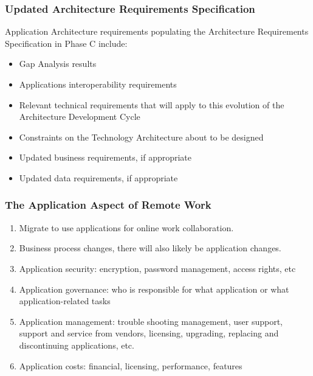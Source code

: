 \documentclass[aspectratio=169, table]{beamer}
\begin{document}
\begin{frame}
	\frametitle{\Large{Updated Architecture Requirements Specification}}
	Application Architecture requirements populating the Architecture Requirements Specification in Phase C include:
	
	\begin{itemize}
		\item Gap Analysis results
		\item Applications interoperability requirements
		\item Relevant technical requirements that will apply to this evolution of the Architecture Development Cycle
		\item Constraints on the Technology Architecture about to be designed
		\item Updated business requirements, if appropriate
		\item Updated data requirements, if appropriate
	\end{itemize}
\end{frame}


\begin{frame}
    \frametitle{The Application Aspect of Remote Work}
    \begin{enumerate}
        \item Migrate to use applications for online work collaboration.
        \item Business process changes, there will also likely be application changes.
        \item Application security: encryption, password management, access rights, etc
        \item Application governance: who is responsible for what application or what application-related tasks
        \item Application management: trouble shooting management, user support, support and service from vendors, licensing, upgrading, replacing and discontinuing applications, etc.
        \item Application costs: financial, licensing, performance, features
    \end{enumerate}
\end{frame}
\end{document}
